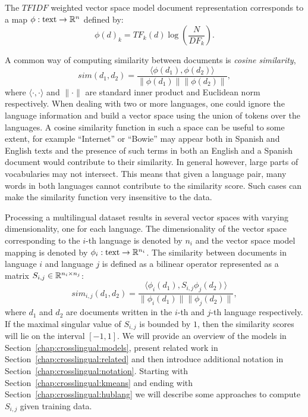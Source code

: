 The $TFIDF$ weighted vector space model document representation corresponds
to a map $\phi : \text{text} \rightarrow \mathbb{R}^n$ defined by:
$$\phi(d)_k = {TF}_k(d) \log\left( \frac{N}{{DF}_k}\right).$$

A common way of computing similarity between documents is \emph{cosine similarity},
$$sim(d_1, d_2) = \frac{\langle \phi(d_1), \phi(d_2)\rangle}{\|\phi(d_1)\| \|\phi(d_2)\|},$$
where $\langle \cdot,\cdot \rangle$ and $\|\cdot\|$ are standard inner product and
Euclidean norm respectively. When dealing with two or more languages, one could ignore the language information
and build a vector space using the union of tokens over the languages. A cosine similarity
function in such a space can be useful to some extent, for example ``Internet'' or ``Bowie''
may appear both in Spanish and English texts and the presence of such terms in both an
English and a Spanish document would contribute to their similarity. In general however,
large parts of vocabularies may not intersect. This means that given a language pair,
many words in both languages cannot contribute to the similarity score. Such cases
can make the similarity function very insensitive to the data.

Processing a multilingual dataset results in several vector spaces with varying dimensionality,
one for each language. The dimensionality of the vector space corresponding to the $i$-th
language is denoted by $n_i$ and the vector space model mapping is denoted by
$\phi_i : \text{text} \rightarrow \mathbb{R}^{n_i}$.
The similarity between documents in language $i$ and language $j$ is defined as a bilinear
operator represented as a matrix $S_{i,j} \in \mathbb{R}^{n_i \times n_j}$:
$$sim_{i,j}(d_1, d_2) = \frac{ \langle \phi_i (d_1), S_{i,j} \phi_j (d_2) \rangle }{\|\phi_i(d_1)\| \|\phi_j(d_2)\|},$$
where $d_1$ and $d_2$ are documents written in the $i$-th and $j$-th language respectively.
If the maximal singular value of $S_{i,j}$ is bounded by $1$, then the similarity scores
will lie on the interval $[-1, 1]$. We will provide an overview of the models in
Section~\ref{chap:crosslingual:models}, present related work in Section~\ref{chap:crosslingual:related} 
and then introduce additional notation in Section~\ref{chap:crosslingual:notation}.
Starting with Section~\ref{chap:crosslingual:kmeans} and ending with Section~\ref{chap:crosslingual:hublang} we will
describe some approaches to compute $S_{i,j}$ given training data.

